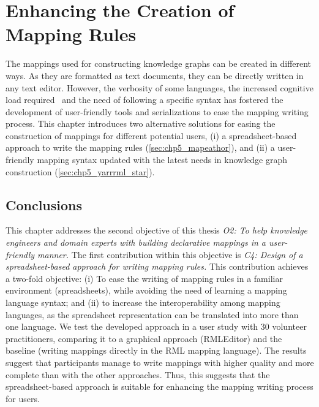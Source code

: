 
\chapter{Enhancing the Creation of Mapping Rules}
\label{chapter:creation}

The mappings used for constructing knowledge graphs can be created in different ways. As they are formatted as text documents, they can be directly written in any text editor. However, the verbosity of some languages, the increased cognitive load required~\parencite{junior2018mental} and the need of following a specific syntax has fostered the development of user-friendly tools and serializations to ease the mapping writing process. This chapter introduces two alternative solutions for easing the construction of mappings for different potential users, (i) a spreadsheet-based approach to write the mapping rules (\cref{sec:chp5_mapeathor}), and (ii) a user-friendly mapping syntax updated with the latest needs in knowledge graph construction (\cref{sec:chp5_yarrrml_star}).





\section{Conclusions}

This chapter addresses the second objective of this thesis \textit{O2: To help knowledge engineers and domain experts with building declarative mappings in a user-friendly manner.}
The first contribution within this objective is \textit{C4: Design of a spreadsheet-based approach for writing mapping rules.} This contribution achieves a two-fold objective: (i) To ease the writing of mapping rules in a familiar environment (spreadsheets), while avoiding the need of learning a mapping language syntax; and (ii) to increase the interoperability among mapping languages, as the spreadsheet representation can be translated into more than one language. We test the developed approach in a user study with 30 volunteer practitioners, comparing it to a graphical approach (RMLEditor) and the baseline (writing mappings directly in the RML mapping language). The results suggest that participants manage to write mappings with higher quality and more complete than with the other approaches. Thus, this suggests that the spreadsheet-based approach is suitable for enhancing the mapping writing process for users. 

